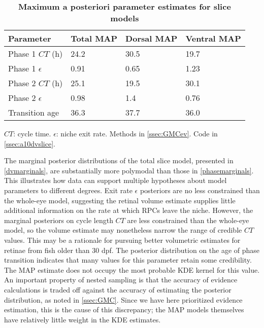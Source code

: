 \begin{table}[!ht]
    \centering
    \caption{{\bf Maximum a posteriori parameter estimates for slice models}}
    \begin{tabular}{|l|l|l|l|}
        \hline
        {\bf Parameter} & {\bf Total MAP} & {\bf Dorsal MAP} & {\bf Ventral MAP}\\ \hline
        Phase 1 $CT$ (h) & 24.2 & 30.5 & 19.7\\ \hline
        Phase 1 $\epsilon$ & 0.91 & 0.65 & 1.23\\ \hline
        Phase 2 $CT$ (h) & 25.1 & 19.5 & 30.1\\ \hline
        Phase 2 $\epsilon$ & 0.98 & 1.4 & 0.76\\ \hline
        Transition age & 36.3 & 37.7 & 36.0\\ \hline
        \end{tabular}
    \begin{flushleft}
        $CT$: cycle time.
        $\epsilon$: niche exit rate.
        Methods in \autoref{ssec:GMCev}.
        Code in \autoref{ssec:a10dvslice}.    
    \end{flushleft}
    \label{dvMAPtable}
\end{table}

The marginal posterior distributions of the total slice model, presented in \autoref{dvmarginals}, are substantially more polymodal than those in \autoref{phasemarginals}. This illustrates how data can support multiple hypotheses about model parameters to different degrees. Exit rate $\epsilon$ posteriors are no less constrained than the whole-eye model, suggesting the retinal volume estimate supplies little additional information on the rate at which RPCs leave the niche. However, the marginal posteriors on cycle length $CT$ are less constrained than the whole-eye model, so the volume estimate may nonetheless narrow the range of credible $CT$ values. This may be a rationale for pursuing better volumetric estimates for retinae from fish older than 30 dpf. The posterior distribution on the age of phase transition indicates that many values for this parameter retain some credibility. The MAP estimate does not occupy the most probable KDE kernel for this value. An important property of nested sampling is that the accuracy of evidence calculations is traded off against the accuracy of estimating the posterior distribution, as noted in \autoref{ssec:GMC}. Since we have here prioritized evidence estimation, this is the cause of this discrepancy; the MAP models themselves have relatively little weight in the KDE estimates.

